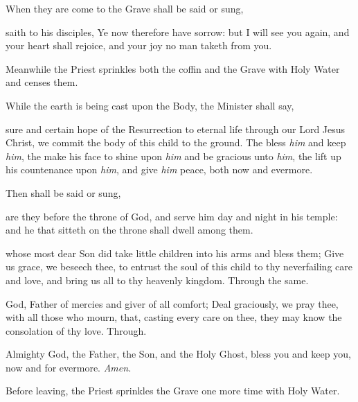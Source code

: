 \begin{rubric}
    When they are come to the Grave shall be said or sung,
\end{rubric}
 saith to his disciples, Ye now therefore have sorrow: but I will see you again, and your heart shall rejoice, and your joy no man taketh from you.

\begin{rubric}
    Meanwhile the Priest sprinkles both the coffin and the Grave with Holy Water and censes them.\par
    While the earth is being cast upon the Body, the Minister shall say,
\end{rubric}\par
{}
 sure and certain hope of the Resurrection to eternal life through our Lord Jesus Christ, we commit the body of this child to the ground. The  bless \textit{him} and keep \textit{him}, the  make his face to shine upon \textit{him} and be gracious unto \textit{him}, the  lift up his countenance upon \textit{him}, and give \textit{him} peace, both now and evermore.

\begin{rubric}
    Then shall be said or sung,
\end{rubric}

 are they before the throne of God, and serve him day and night in his temple: and he that sitteth on the throne shall dwell among them.\par

{} whose most dear Son did take little children into his arms and bless them; Give us grace, we beseech thee, to entrust the soul of this child to thy neverfailing care and love, and bring us all to thy heavenly kingdom. Through the same.\par
{}
 God, Father of mercies and giver of all comfort; Deal graciously, we pray thee, with all those who mourn, that, casting every care on thee, they may know the consolation of thy love. Through.\par
{}
 Almighty God, the Father, the {} Son, and the Holy Ghost, bless you and keep you, now and for evermore. \textit{Amen.}

\begin{rubric}
    Before leaving, the Priest sprinkles the Grave one more time with Holy Water.
\end{rubric}